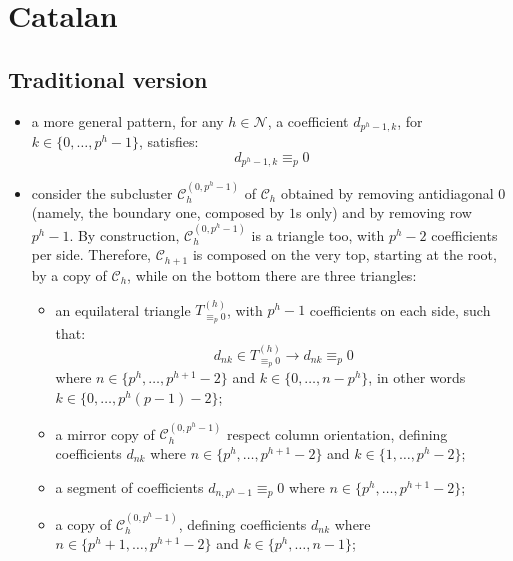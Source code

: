 \documentclass[11pt,a4paper]{article} %
\begin{document}
    \section{Catalan}

    \subsection{Traditional version}

    \begin{itemize}
        \item a more general pattern, for any $h\in\mathcal{N}$, 
            a coefficient $d_{p^{h}-1,k}$, for $k\in\lbrace0,\ldots,p^{h}-1 \rbrace$, 
            satisfies:
            \begin{displaymath}
                d_{p^{h}-1,k} \equiv_{p} 0
            \end{displaymath}
        \item consider the subcluster $\mathcal{C}_{h}^{(0,p^{h}-1)}$ of 
            $\mathcal{C}_{h}$ obtained by removing antidiagonal $0$ (namely,
            the boundary one, composed by $1$s only) and by removing row $p^{h}-1$.
            By construction, $\mathcal{C}_{h}^{(0,p^{h}-1)}$ is a triangle too, 
            with $p^{h}-2$ coefficients per side. Therefore, $\mathcal{C}_{h+1}$
            is composed on the very top, starting at the root, by a copy of $\mathcal{C}_{h}$,
            while on the bottom there are three triangles:
            \begin{itemize}                
                \item an equilateral triangle $T_{\equiv_{p} 0}^{(h)}$, 
                    with $p^{h}-1$ coefficients on each side, such that:
                    \begin{displaymath}
                        d_{nk} \in T_{\equiv_{p} 0}^{(h)} \rightarrow d_{nk} \equiv_{p} 0
                    \end{displaymath}
                    where $n\in\lbrace p^{h},\ldots,p^{h+1}-2\rbrace$ and 
                    $k\in\lbrace 0,\ldots, n-p^{h}\rbrace$, in other words
                    $k\in\lbrace 0,\ldots, p^{h}(p-1)-2\rbrace$;
                \item a mirror copy of $\mathcal{C}_{h}^{(0,p^{h}-1)}$ respect column orientation,
                    defining coefficients $d_{nk}$  
                    where $n\in\lbrace p^{h},\ldots,p^{h+1}-2\rbrace$ and 
                    $k\in\lbrace 1,\ldots, p^{h}-2\rbrace$;
                \item a segment of coefficients $d_{n, p^{h}-1} \equiv_{p} 0$ 
                    where $n\in\lbrace p^{h},\ldots,p^{h+1}-2\rbrace$;
                \item a copy of $\mathcal{C}_{h}^{(0,p^{h}-1)}$,
                    defining coefficients $d_{nk}$  
                    where $n\in\lbrace p^{h}+1,\ldots,p^{h+1}-2\rbrace$ and 
                    $k\in\lbrace p^{h},\ldots, n-1\rbrace$;
            \end{itemize}                
    \end{itemize}
\end{document}
